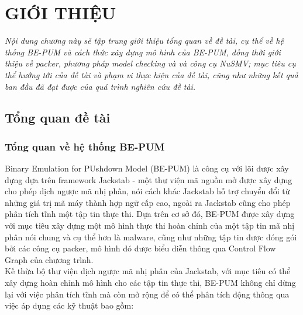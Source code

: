 
\newpage
{}

\chapter{GIỚI THIỆU}

\begin{concept}[15cm]
\textit{Nội dung chương này sẽ tập trung giới thiệu tổng quan về đề tài, cụ thể về hệ thống BE-PUM và cách thức xây dựng mô hình của BE-PUM, đồng thời giới thiệu về packer, phương pháp model checking và và công cụ NuSMV; mục tiêu cụ thể hướng tới của đề tài và phạm vi thực hiện của đề tài, cũng như những kết quả ban đầu đã đạt được của quá trình nghiên cứu đề tài.}
\end{concept}

\section{Tổng quan đề tài}

\subsection{Tổng quan về hệ thống BE-PUM}

\hspace{0.5cm}Binary Emulation for PUshdown Model (BE-PUM) là công cụ với lõi được xây dựng dựa trên framework Jackstab - một thư viện mã nguồn mở được xây dựng cho phép dịch ngược mã nhị phân, nói cách khác Jackstab hỗ trợ chuyển đổi từ những giá trị mã máy thành hợp ngữ cấp cao, ngoài ra Jackstab cũng cho phép phân tích tĩnh một tập tin thực thi. Dựa trên cơ sở đó, BE-PUM được xây dựng với mục tiêu xây dựng một mô hình thực thi hoàn chỉnh của một tập tin mã nhị phân nói chung và cụ thể hơn là malware, cũng như những tập tin được đóng gói bởi các công cụ packer, mô hình đó được biểu diễn thông qua Control Flow Graph của chương trình.\\ 

\hspace{0.5cm}Kế thừa bộ thư viện dịch ngược mã nhị phân của Jackstab, với mục tiêu có thể xây dựng hoàn chỉnh mô hình cho các tập tin thực thi, BE-PUM không chỉ dừng lại với việc phân tích tĩnh mà còn mở rộng để có thể phân tích động thông qua việc áp dụng các kỹ thuật bao gồm:

